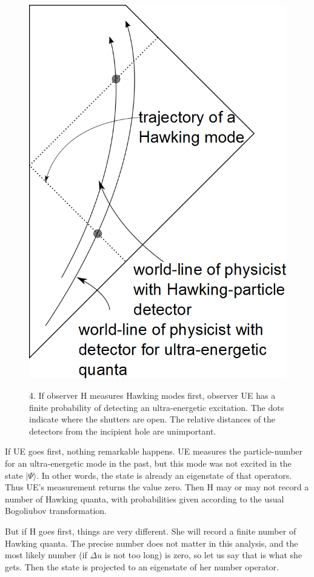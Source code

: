 \documentclass[
%
draft    %
,numberedheadings 
,bibliocites
  ]
  {aipproc}
\begin{document}
\begin{figure}
\vspace{-1.2em}
  \begin{flushright}
{\includegraphics[width=.35\textwidth]{HUEObs.png}}
\makebox[.35\textwidth]{$\ $ }
\vspace{-.1em}
\parbox{.35\textwidth}{4.  If observer H measures Hawking modes first, observer UE has a finite probability of detecting an ultra-energetic excitation.  The dots indicate where the shutters are open.  The relative distances of the detectors from the incipient hole are unimportant.}
\end{flushright}
\label{fig:HUE}
\end{figure}

If UE goes first, nothing remarkable happens.  UE measures the particle-number for an ultra-energetic mode in the past, but this mode was not excited in the state $|\Psi\rangle$.  In other words, the state is already an eigenstate of that operators.  Thus UE's measurement returns the value zero.  Then H may or may not record a number of Hawking quanta, with probabilities given according to the usual Bogoliubov transformation.



But if H goes first, things are very different.  She will record a finite number of Hawking quanta.  The precise number does not matter in this analysis, and the most likely number (if $\Delta u$ is not too long) is zero, so let us say that is what she gets.  Then the state is projected to an eigenstate of her number operator.
\end{document}
